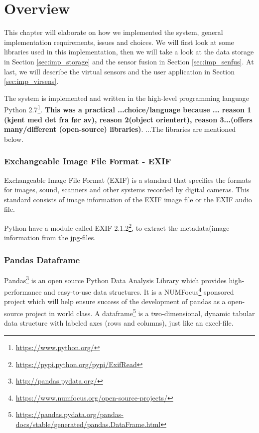 \documentclass[USenglish]{uit-thesis}
\begin{document}
\section{Overview}
This chapter will elaborate on how we implemented the system, general implementation requirements, issues and choices. 
We will first look at some libraries used in this implementation, then we will take a look at the data storage in Section \ref{sec:imp_storage} and the sensor fusion in Section \ref{sec:imp_senfus}. At last, we will describe the virtual sensors and the user application in Section \ref{sec:imp_virsens}.

The system is implemented and written in the high-level programming language Python 2.7\footnote{\url{https://www.python.org/}}. \textbf{ This was a practical ...choice/language because ... reason 1 (kjent med det fra før av), reason 2(object orientert), reason 3...(offers many/different (open-source) libraries)}. ...The libraries are mentioned below.


\subsubsection{Exchangeable Image File Format - EXIF} \label{sssec:imp_exif}
Exchangeable Image File Format (EXIF) is a standard that specifies the formats for images, sound, scanners and other systems recorded by digital cameras. This standard consists of image information of the EXIF image file or the EXIF audio file.

Python have a module called  EXIF 2.1.2\footnote{\url{https://pypi.python.org/pypi/ExifRead}}, to extract the metadata(image information from the jpg-files.

\subsubsection{Pandas Dataframe} \label{sssec:imp_df}
Pandas\footnote{\url{http://pandas.pydata.org/}} is an open source Python Data Analysis Library which provides high-performance and easy-to-use data structures. It is a NUMFocus\footnote{\url{https://www.numfocus.org/open-source-projects/}} sponsored project which will help ensure success of the development of pandas as a open-source project in world class. A dataframe\footnote{\url{https://pandas.pydata.org/pandas-docs/stable/generated/pandas.DataFrame.html}} is a two-dimensional, dynamic tabular data structure with labeled axes (rows and columns), just like an excel-file.
\end{document}
